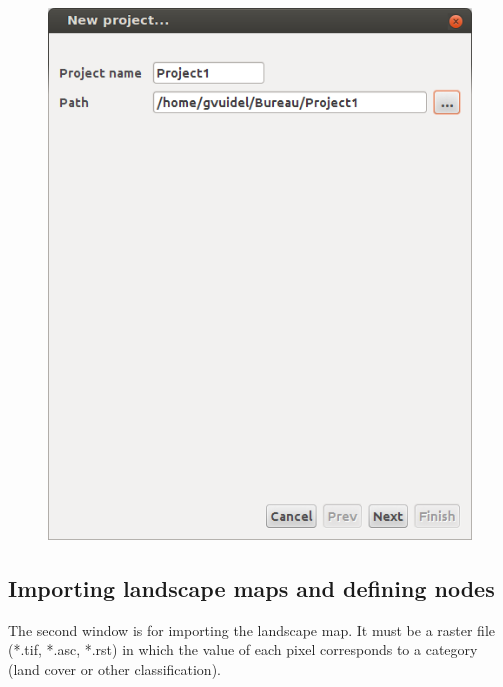 \documentclass{article}
\begin{document}
\begin{figure}[H]
	\includegraphics[scale=0.5]{img/manual-en_img2.png}
\end{figure}


\subsection{Importing landscape maps and defining nodes }

The second window is for importing the landscape map. It must be a raster file (*.tif, *.asc, *.rst) in which the value of each pixel corresponds to a category (land cover or other classification).
\end{document}
